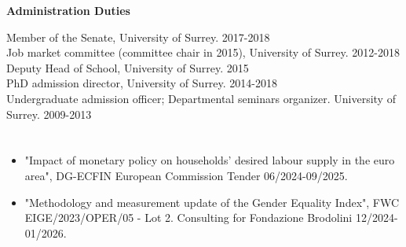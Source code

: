 \documentclass[margin, 11pt]{res} %
\begin{document}
\begin{resume}

\textbf{Administration Duties}

Member of the Senate, University of Surrey. \hfill 2017-2018\\
Job market committee (committee chair in 2015), University of Surrey. \hfill 2012-2018\\
Deputy Head of School, University of Surrey. \hfill 2015\\
 PhD admission director, University of Surrey. \hfill 2014-2018\\
Undergraduate admission officer; Departmental seminars organizer. University of Surrey. \hfill 2009-2013

\section{}
\begin{itemize}
\item "Impact of monetary policy on households' desired labour supply in the euro area", DG-ECFIN European Commission Tender \hfill 06/2024-09/2025.
\item "Methodology and measurement update of the Gender Equality Index", FWC EIGE/2023/OPER/05 - Lot 2. Consulting for Fondazione Brodolini \hfill 12/2024-01/2026.
\end{itemize}


\end{resume}
\end{document}

